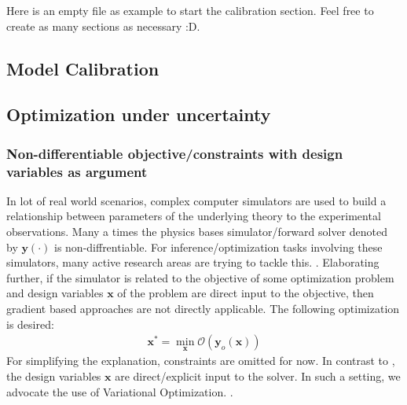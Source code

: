 Here is an empty file as example to start the calibration section.
Feel free to create as many sections as necessary :D.

\subsection{Model Calibration}
















\subsection{Optimization under uncertainty}






\subsubsection{Non-differentiable objective/constraints with design variables as argument}
%
In lot of real world scenarios, complex computer simulators are used to build a relationship between parameters of the underlying theory to the experimental observations. Many a times the physics bases simulator/forward solver denoted by $\bm{y}(\cdot)$ is non-diffrentiable. For inference/optimization tasks involving these simulators, many active research areas are trying to tackle this. \cite{cranmer2020frontier, louppe_adversarial_2019, beaumont2002approximate,marjoram2003markov}. Elaborating further, if the simulator is related to the objective of some optimization problem and design variables $\bm{x}$ of the problem are direct input to the objective, then gradient based approaches are not directly applicable. The following optimization is desired:
\begin{align}
    \bm{x}^* = \min_{\bm{x}}\mathcal{O}(\bm{y}_o(\bm{x}))
\end{align}
%
For simplifying the explanation, constraints are omitted for now. In contrast to , the design variables $\bm{x}$ are direct/explicit input to the solver. In such a setting, we advocate the use of Variational Optimization. \cite{bird_stochastic_2018,staines_variational_2012,staines2013optimization}. 

